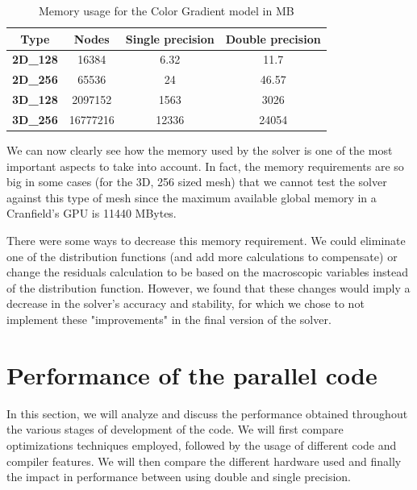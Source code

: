 \documentclass[12pt]{book}
\begin{document}
\begin{table}[H]
	\centering
	\begin{tabular}{|c|c|c|c|}
		\hline
		\textbf{Type}    & \textbf{Nodes} & \textbf{Single precision} & \textbf{Double precision} \\ \hline
		\textbf{2D\_128} & 16384          & 6.32                      & 11.7                      \\ \hline
		\textbf{2D\_256} & 65536          & 24                        & 46.57                     \\ \hline
		\textbf{3D\_128} & 2097152        & 1563                      & 3026                      \\ \hline
		\textbf{3D\_256} & 16777216       & 12336                     & 24054                     \\ \hline
	\end{tabular}
	\caption{Memory usage for the Color Gradient model in MB}
	\label{tab:memCG}
\end{table}

We can now clearly see how the memory used by the solver is one of the most important aspects to take into account. In fact, the memory requirements are so big in some cases (for the 3D, 256 sized mesh) that we cannot test the solver against this type of mesh since the maximum available global memory in a Cranfield's GPU is 11440 MBytes. \par
There were some ways to decrease this memory requirement. We could eliminate one of the distribution functions (and add more calculations to compensate) or change the residuals calculation to be based on the macroscopic variables instead of the distribution function. However, we found that these changes would imply a decrease in the solver's accuracy and stability, for which we chose to not implement these "improvements" in the final version of the solver.

\section{Performance of the parallel code}\label{sec:performance}
In this section, we will analyze and discuss the performance obtained throughout the various stages of development of the code. We will first compare optimizations techniques employed, followed by the usage of different code and compiler features. We will then compare the different hardware used and finally the impact in performance between using double and single precision. 
\end{document}
